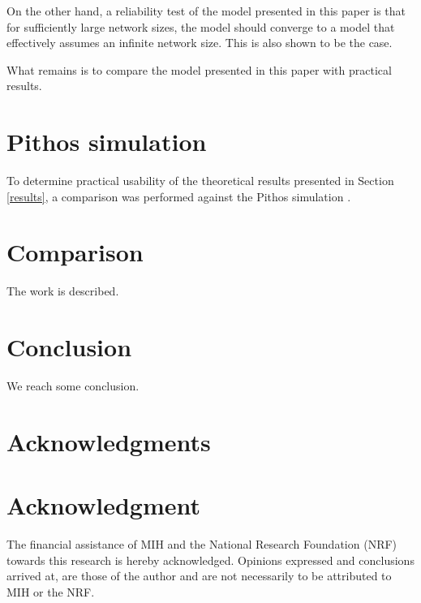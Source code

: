 \documentclass[10pt,a4paper,conference]{IEEEtran}
\begin{document}
On the other hand, a reliability test of the model presented in this paper is that for sufficiently large network sizes, the model should converge to a model that effectively assumes an infinite network size. This is also shown to be the case.

What remains is to compare the model presented in this paper with practical results.

\section{Pithos simulation}
\label{simulation}

To determine practical usability of the theoretical results presented in Section \ref{results}, a comparison was performed against the Pithos simulation \cite{Pithos_mmve_2011}.


\section{Comparison}
\label{comparison}

The work is described.

\section{Conclusion}
\label{conclusion}

We reach some conclusion.

\ifCLASSOPTIONcompsoc
  \section*{Acknowledgments}
\else
  \section*{Acknowledgment}
\fi

The financial assistance of MIH and the National Research Foundation (NRF) towards this research is hereby acknowledged. Opinions expressed and
conclusions arrived at, are those of the author and are not necessarily to be attributed to MIH or the NRF.




\end{document}
